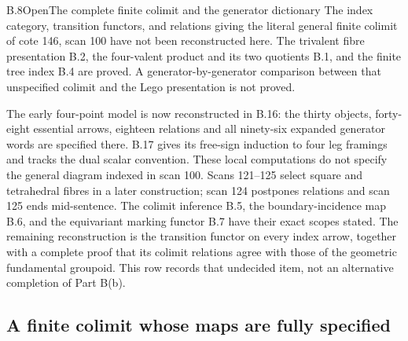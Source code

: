 \begin{result}{B.8}{Open}{The complete finite colimit and the generator dictionary}
The index category, transition functors, and relations giving the
literal general finite colimit of cote 146, scan 100 have not been
reconstructed here.  The trivalent fibre presentation B.2, the
four-valent product and its two quotients B.1, and the finite tree
index B.4 are proved.  A generator-by-generator comparison between
that unspecified colimit and the Lego presentation is not proved.
\end{result}
The early four-point model is now reconstructed in B.16: the
thirty objects, forty-eight essential arrows, eighteen relations
and all ninety-six expanded generator words are specified there.
B.17 gives its free-sign induction to four leg framings and tracks
the dual scalar convention.  These local computations do not
specify the general diagram indexed in scan 100.  Scans 121--125
select square and tetrahedral fibres in a later construction;
scan 124 postpones relations and scan 125 ends mid-sentence.
The colimit inference B.5, the boundary-incidence map B.6, and
the equivariant marking functor B.7 have their exact scopes stated.
The remaining reconstruction is the transition functor on every
index arrow, together with a complete proof that its colimit
relations agree with those of the geometric fundamental groupoid.
This row records that undecided item, not an alternative completion
of Part B(b).

\subsection{A finite colimit whose maps are fully specified}

